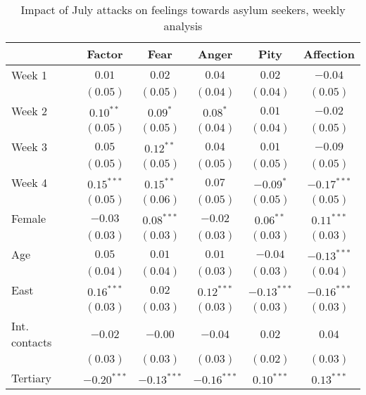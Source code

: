 
\begin{table}
\caption{Impact of July attacks on feelings towards asylum seekers, weekly analysis}
\begin{center}
\begin{tabular}{l c c c c c}
\toprule
 & Factor & Fear & Anger & Pity & Affection \\
\midrule
Week 1        & $0.01$        & $0.02$        & $0.04$        & $0.02$        & $-0.04$       \\
              & $(0.05)$      & $(0.05)$      & $(0.04)$      & $(0.04)$      & $(0.05)$      \\
Week 2        & $0.10^{**}$   & $0.09^{*}$    & $0.08^{*}$    & $0.01$        & $-0.02$       \\
              & $(0.05)$      & $(0.05)$      & $(0.04)$      & $(0.04)$      & $(0.05)$      \\
Week 3        & $0.05$        & $0.12^{**}$   & $0.04$        & $0.01$        & $-0.09$       \\
              & $(0.05)$      & $(0.05)$      & $(0.05)$      & $(0.05)$      & $(0.05)$      \\
Week 4        & $0.15^{***}$  & $0.15^{**}$   & $0.07$        & $-0.09^{*}$   & $-0.17^{***}$ \\
              & $(0.05)$      & $(0.06)$      & $(0.05)$      & $(0.05)$      & $(0.05)$      \\
Female        & $-0.03$       & $0.08^{***}$  & $-0.02$       & $0.06^{**}$   & $0.11^{***}$  \\
              & $(0.03)$      & $(0.03)$      & $(0.03)$      & $(0.03)$      & $(0.03)$      \\
Age           & $0.05$        & $0.01$        & $0.01$        & $-0.04$       & $-0.13^{***}$ \\
              & $(0.04)$      & $(0.04)$      & $(0.03)$      & $(0.03)$      & $(0.04)$      \\
East          & $0.16^{***}$  & $0.02$        & $0.12^{***}$  & $-0.13^{***}$ & $-0.16^{***}$ \\
              & $(0.03)$      & $(0.03)$      & $(0.03)$      & $(0.03)$      & $(0.03)$      \\
Int. contacts & $-0.02$       & $-0.00$       & $-0.04$       & $0.02$        & $0.04$        \\
              & $(0.03)$      & $(0.03)$      & $(0.03)$      & $(0.02)$      & $(0.03)$      \\
Tertiary      & $-0.20^{***}$ & $-0.13^{***}$ & $-0.16^{***}$ & $0.10^{***}$  & $0.13^{***}$  \\

\end{tabular}
\end{center}
\end{table}
